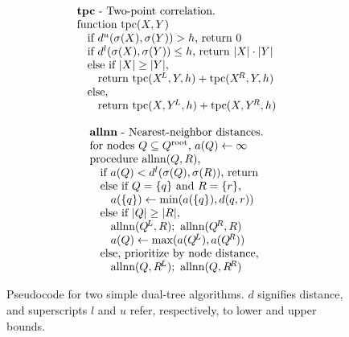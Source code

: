 \documentclass[twoside,leqno,twocolumn]{article}
\newcommand{\psty}{}
\newcommand{\X}{\\ \psty}
\newcommand{\x}{\X \hspace{0.13in}}
\newcommand{\xx}{\X \hspace{0.26in}}
\newcommand{\kdroot}[1]{#1^{\text{root}}}
\newcommand{\kdleft}[1]{#1^{\!L}}
\newcommand{\kdright}[1]{#1^{\!R}}
\newcommand{\lo}[1]{#1^{l}}
\newcommand{\up}[1]{#1^{u}}
\newcommand{\distlo}{\lo{d}}
\newcommand{\distup}{\up{d}}
\newcommand{\dist}[2]{d(#1,#2)}
\newcommand{\outstat}{\sigma}
\begin{document}
\begin{figure}
  \begin{minipage}{6in}
    \begin{minipage}{2.5in}
      \begin{displaymath}
        \begin{array}[t]{l}
          \text{{\bf tpc} - Two-point correlation.}
          \X \text{function tpc}(X, Y)
          \x \text{if }\distup(\outstat(X), \outstat(Y)) > h\text{, return }0
          \x \text{if }\distlo(\outstat(X), \outstat(Y)) \leq h\text{, return } |X| \cdot |Y|
          \x \text{else if }|X| \geq |Y|\text{,}
          \xx \text{return tpc}(\kdleft{X}, Y, h) + \text{tpc}(\kdright{X}, Y, h)
          \x \text{else,}
          \xx \text{return tpc}(X, \kdleft{Y}, h) + \text{tpc}(X, \kdright{Y}, h)
        \end{array}
       \end{displaymath}
       \vspace{-.1in}
       \caption{\footnotesize \label{fig:allnntpc} Pseudocode for two simple dual-tree algorithms.
       $d$ signifies distance, and superscripts $l$ and $u$ refer, respectively, to lower and upper bounds.}
      \end{minipage}
      \begin{minipage}{3.0in}
       \begin{displaymath}
        \begin{array}[t]{l}
          \text{{\bf allnn} - Nearest-neighbor distances.}
          \X \text{for nodes }Q \subseteq \kdroot{Q}\text{, }a(Q) \gets \infty
          \X \text{procedure allnn}(Q,R)\text{,}
          \x \text{if }a(Q) < \distlo(\outstat(Q), \outstat(R))\text{, return}
          \x \text{else if }Q = \{q\} \text{ and } R = \{r\}\text{,}
          \xx a(\{q\}) \gets \min(a(\{q\}), \dist{q}{r})
          \x \text{else if }|Q| \geq |R|\text{,}
          \xx \text{allnn}(\kdleft{Q}, R); \text{ allnn}(\kdright{Q}, R)
          \xx a(Q) \gets \max(a(\kdleft{Q}), a(\kdright{Q}))
          \x \text{else, prioritize by node distance,}
          \xx \text{allnn}(Q, \kdleft{R}); \text{ allnn}(Q, \kdright{R})
        \end{array}
       \end{displaymath}
      \end{minipage}
  \end{minipage}
\end{figure}
\end{document}
